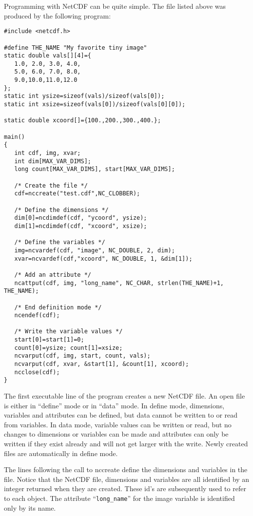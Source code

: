 Programming with NetCDF can be quite simple. The file listed above was
produced by the following program:

\begin{verbatim}
#include <netcdf.h>

#define THE_NAME "My favorite tiny image"
static double vals[][4]={
   1.0, 2.0, 3.0, 4.0,
   5.0, 6.0, 7.0, 8.0,
   9.0,10.0,11.0,12.0
};
static int ysize=sizeof(vals)/sizeof(vals[0]);
static int xsize=sizeof(vals[0])/sizeof(vals[0][0]);

static double xcoord[]={100.,200.,300.,400.};

main()
{
   int cdf, img, xvar;
   int dim[MAX_VAR_DIMS];
   long count[MAX_VAR_DIMS], start[MAX_VAR_DIMS];

   /* Create the file */
   cdf=nccreate("test.cdf",NC_CLOBBER);

   /* Define the dimensions */
   dim[0]=ncdimdef(cdf, "ycoord", ysize);
   dim[1]=ncdimdef(cdf, "xcoord", xsize);

   /* Define the variables */
   img=ncvardef(cdf, "image", NC_DOUBLE, 2, dim);
   xvar=ncvardef(cdf,"xcoord", NC_DOUBLE, 1, &dim[1]);

   /* Add an attribute */
   ncattput(cdf, img, "long_name", NC_CHAR, strlen(THE_NAME)+1, THE_NAME);

   /* End definition mode */
   ncendef(cdf);

   /* Write the variable values */
   start[0]=start[1]=0;
   count[0]=ysize; count[1]=xsize;
   ncvarput(cdf, img, start, count, vals);
   ncvarput(cdf, xvar, &start[1], &count[1], xcoord);
   ncclose(cdf);
}
\end{verbatim}

The first executable line of the program creates a new NetCDF file. An
open file is either in ``define'' mode or in ``data'' mode. In define
mode, dimensions, variables and attributes can be defined, but data
cannot be written to or read from variables. In data mode, variable
values can be written or read, but no changes to dimensions or
variables can be made and attributes can only be written if they exist
already and will not get larger with the write. Newly created files
are automatically in define mode.

The lines following the call to nccreate define the dimensions and
variables in the file. Notice that the NetCDF file, dimensions and
variables are all identified by an integer returned when they are
created. These id's are subsequently used to refer to each object. The
attribute ``\verb+long_name+'' for the image variable is identified
only by its name.

